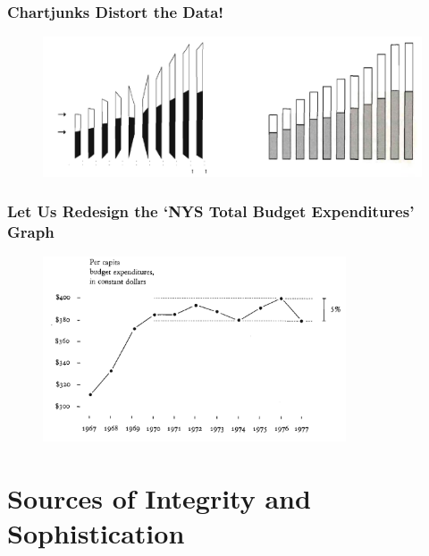 \documentclass[notes, aspectratio=1610]{beamer}
\begin{document}
\begin{frame}
	\frametitle{Chartjunks Distort the Data!}
	\begin{figure}
		\begin{small}
			\begin{center}
				\includegraphics[width=1\textwidth]{
					images/errors_.png
					}
			\end{center}
		\end{small}
	\end{figure}
\end{frame}

\begin{frame}
	\frametitle{Let Us Redesign the `NYS Total Budget Expenditures' Graph}
	\begin{figure}
		\begin{small}
			\begin{center}
				\includegraphics[width=0.8\textwidth]{
					images/redo_nys_budget.png
					}
			\end{center}
		\end{small}
	\end{figure}
\end{frame}




\section{Sources of Integrity and Sophistication}
\end{document}
